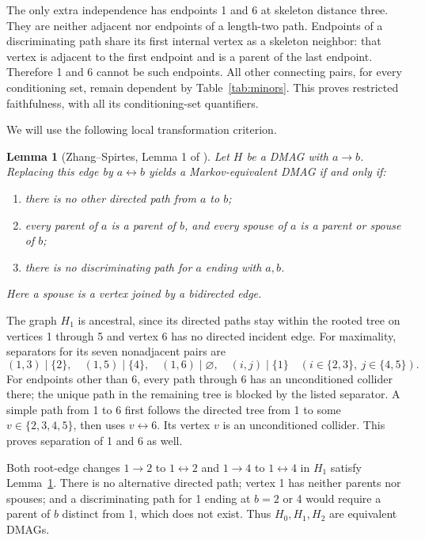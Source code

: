\documentclass[11pt]{article}
\newtheorem{lemma}[theorem]{Lemma}
\newcommand{\bidir}{\leftrightarrow}
\begin{document}
The only extra independence has endpoints 1 and 6 at skeleton distance
three. They are neither adjacent nor endpoints of a length-two path.
Endpoints of a discriminating path share its first internal vertex as a
skeleton neighbor: that vertex is adjacent to the first endpoint and is a
parent of the last endpoint. Therefore 1 and 6 cannot be such endpoints.
All other connecting pairs, for every conditioning set, remain dependent by
Table~\ref{tab:minors}. This proves restricted faithfulness, with all its
conditioning-set quantifiers.

We will use the following local transformation criterion.
\begin{lemma}[Zhang--Spirtes, Lemma 1 of \cite{ZS05}]\label{lem:change}
Let $H$ be a DMAG with $a\to b$. Replacing this edge by $a\bidir b$
yields a Markov-equivalent DMAG if and only if:
\begin{enumerate}
\item there is no other directed path from $a$ to $b$;
\item every parent of $a$ is a parent of $b$, and every spouse of $a$
is a parent or spouse of $b$;
\item there is no discriminating path for $a$ ending with $a,b$.
\end{enumerate}
Here a spouse is a vertex joined by a bidirected edge.
\end{lemma}

The graph $H_1$ is ancestral, since its directed paths stay within the rooted
tree on vertices 1 through 5 and vertex 6 has no directed incident edge.
For maximality, separators for its seven nonadjacent pairs are
\[
(1,3)\mid\{2\},\quad (1,5)\mid\{4\},\quad
(1,6)\mid\varnothing,\quad
(i,j)\mid\{1\}\quad(i\in\{2,3\},\ j\in\{4,5\}).
\]
For endpoints other than 6, every path through 6 has an unconditioned
collider there; the unique path in the remaining tree is blocked by the
listed separator. A simple path from 1 to 6 first follows the directed
tree from 1 to some $v\in\{2,3,4,5\}$, then uses $v\bidir6$.
Its vertex $v$ is an unconditioned collider. This proves separation of
1 and 6 as well.

Both root-edge changes $1\to2$ to $1\bidir2$ and $1\to4$ to $1\bidir4$
in $H_1$ satisfy Lemma~\ref{lem:change}. There is no alternative directed
path; vertex 1 has neither parents nor spouses; and a discriminating path
for 1 ending at $b=2$ or 4 would require a parent of $b$ distinct from 1,
which does not exist. Thus $H_0,H_1,H_2$ are equivalent DMAGs.
\end{document}
